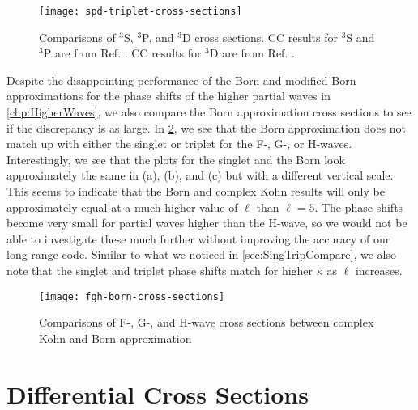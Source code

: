 \documentclass[Dissertation.tex]{subfiles}
\begin{document}
\begin{figure}[H]
	\centering
	\texttt{[image: spd-triplet-cross-sections]}
	\caption[Comparisons of $^3$S, $^3$P, and $^3$D cross sections.]{Comparisons of $^3$S, $^3$P, and $^3$D cross sections. CC results for $^3$S and $^3$P are from Ref. \cite{Walters2004}. CC results for $^3$D are from Ref. \cite{Blackwood2002}.}
	\label{fig:spd-triplet-cross-sections}
\end{figure}

Despite the disappointing performance of the Born and modified Born 
approximations for the phase shifts of the higher partial waves in
\cref{chp:HigherWaves}, we also compare the Born approximation cross sections
to see if the discrepancy is as large. In \cref{fig:fgh-born-cross-sections},
we see that the Born approximation does not match up with either the singlet
or triplet for the F-, G-, or H-waves. Interestingly, we see that the plots
for the singlet and the Born look approximately the same in (a), (b), and (c)
but with a different vertical scale. This seems to indicate that the Born and complex
Kohn results will only be approximately equal at a much higher value of $\ell$
than $\ell = 5$. The phase shifts become very small for partial waves higher
than the H-wave, so we would not be able to investigate these much further 
without improving the accuracy of our long-range code. Similar to what we
noticed in \cref{sec:SingTripCompare}, we also note that the singlet and
triplet phase shifts match for higher $\kappa$ as $\ell$ increases.

\begin{figure}[H]
	\centering
	\texttt{[image: fgh-born-cross-sections]}
	\caption[Comparisons of F-, G-, and H-wave cross sections]{Comparisons of F-, G-, and H-wave cross sections between complex Kohn and Born approximation}
	\label{fig:fgh-born-cross-sections}
\end{figure}


\section{Differential Cross Sections}
\label{sec:diffcross}

\end{document}
